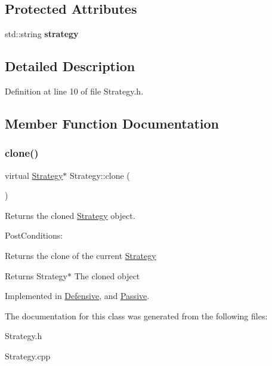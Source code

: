 \subsection*{Protected Attributes}
\begin{DoxyCompactItemize}
\item 
\mbox{\label{classStrategy_ab27bc814cf1804ca3b5fdbfb99d4a2cb}} 
std\+::string {\bfseries strategy}
\end{DoxyCompactItemize}


\subsection{Detailed Description}


Definition at line 10 of file Strategy.\+h.



\subsection{Member Function Documentation}
\mbox{\label{classStrategy_aaed20ba057db079ae2bc41b19b009211}} 
\subsubsection{\texorpdfstring{clone()}{clone()}}
{\footnotesize\ttfamily virtual \hyperlink{classStrategy}{Strategy}$\ast$ Strategy\+::clone (\begin{DoxyParamCaption}{ }\end{DoxyParamCaption})\hspace{0.3cm}{\ttfamily [pure virtual]}}



Returns the cloned \hyperlink{classStrategy}{Strategy} object. 

Post\+Conditions\+:
\begin{DoxyItemize}
\item Returns the clone of the current \hyperlink{classStrategy}{Strategy}
\end{DoxyItemize}

\begin{DoxyReturn}{Returns}
Strategy$\ast$ The cloned object 
\end{DoxyReturn}


Implemented in \hyperlink{classDefensive_afad21efc8bf51879f85f9d02e695cfa6}{Defensive}, and \hyperlink{classPassive_a576243ca77e794959cfcb33e772856a4}{Passive}.



The documentation for this class was generated from the following files\+:\begin{DoxyCompactItemize}
\item 
Strategy.\+h\item 
Strategy.\+cpp\end{DoxyCompactItemize}
